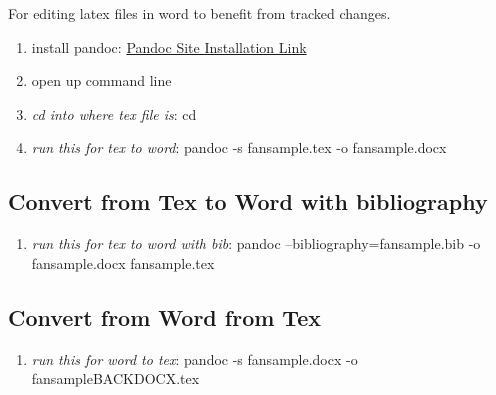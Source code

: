 \documentclass[12pt,english]{article}
\begin{document}
For editing latex files in word to benefit from tracked changes.

\begin{enumerate}
	\item install pandoc: \href{https://pandoc.org/installing.html}{Pandoc Site Installation Link}
	\item open up command line
	\item \textit{cd into where tex file is}: cd 
	\item \textit{run this for tex to word}: pandoc -s fansample.tex -o fansample.docx
\end{enumerate}

\subsection{Convert from Tex to Word with bibliography}

\begin{enumerate}
	\item \textit{run this for tex to word with bib}: pandoc --bibliography=fansample.bib -o fansample.docx fansample.tex
\end{enumerate}

\subsection{Convert from Word from Tex}

\begin{enumerate}
	\item \textit{run this for word to tex}: pandoc -s fansample.docx -o fansampleBACKDOCX.tex
\end{enumerate}


\printbibliography
\end{document}
